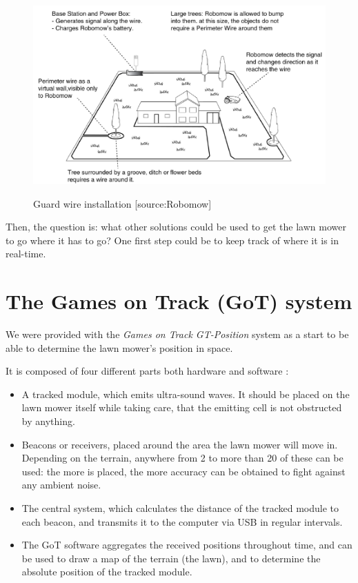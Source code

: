 \begin{figure}[H]
\centering
\includegraphics[scale=0.6]{figures/robomow.png} 
\label{fig:robomow}
\caption{Guard wire installation [source:Robomow]} 
\end{figure}
\noindent

Then, the question is: what other solutions could be used to get the lawn mower to go where it has to go?
One first step could be to keep track of where it is in real-time.

\section{The Games on Track (GoT) system}
We were provided with the \emph{Games on Track GT-Position} system as a start to be able to determine the lawn mower's position in space. 

\noindent
It is composed of four different parts both hardware and software :
\begin{itemize}
	\item A tracked module, which emits ultra-sound waves. It should be placed on the lawn mower itself while taking care, that the emitting cell is not obstructed by anything.
	\item Beacons or receivers, placed around the area the lawn mower will move in. Depending on the terrain, anywhere from 2  to more than 20 of these can be used: the more is placed, the more accuracy can be obtained to fight against any ambient noise.
	\item The central system, which calculates the distance of the tracked module to each beacon, and transmits it to the computer via USB in regular intervals.
	\item The GoT software aggregates the received positions throughout time, and can be used to draw a map of the terrain (the lawn), and to determine the absolute position of the tracked module.
\end{itemize}

